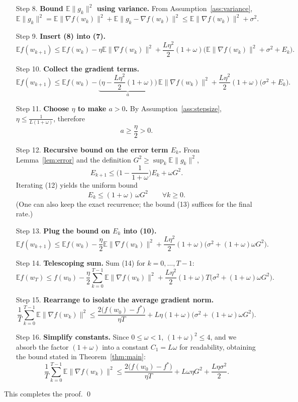 \documentclass{article}
\newcommand{\E}{\mathbb{E}}
\begin{document}
\begin{enumerate}
\item[Step 8.] \textbf{Bound $\E\|g_{k}\|^{2}$ using variance.}  
From Assumption~\ref{ass:variance},
\[
\E\|g_{k}\|^{2}
 =\E\|\nabla f(w_{k})\|^{2}+\E\|g_{k}-\nabla f(w_{k})\|^{2}
 \le \E\|\nabla f(w_{k})\|^{2}+\sigma^{2}. \tag{8}
\]

\item[Step 9.] \textbf{Insert (8) into (7).}
\[
\E f(w_{k+1})\le \E f(w_{k})
-\eta\E\|\nabla f(w_{k})\|^{2}
+\frac{L\eta^{2}}{2}(1+\omega)\Big(\E\|\nabla f(w_{k})\|^{2}+\sigma^{2}+E_{k}\Big). \tag{9}
\]

\item[Step 10.] \textbf{Collect the gradient terms.}
\[
\E f(w_{k+1})\le \E f(w_{k})
-\underbrace{\Big(\eta-\frac{L\eta^{2}}{2}(1+\omega)\Big)}_{\displaystyle a}\,\E\|\nabla f(w_{k})\|^{2}
+\frac{L\eta^{2}}{2}(1+\omega)\big(\sigma^{2}+E_{k}\big). \tag{10}
\]

\item[Step 11.] \textbf{Choose $\eta$ to make $a>0$.}  
By Assumption~\ref{ass:stepsize}, $\eta\le\frac{1}{L(1+\omega)}$, therefore
\[
a\ge \frac{\eta}{2}>0. \tag{11}
\]

\item[Step 12.] \textbf{Recursive bound on the error term $E_{k}$.}  
From Lemma~\ref{lem:error} and the definition $G^{2}\ge\sup_{k}\E\|g_{k}\|^{2}$,
\[
E_{k+1}\le\Big(1-\frac{1}{1+\omega}\Big)E_{k}+\omega G^{2}. \tag{12}
\]
Iterating (12) yields the uniform bound
\[
E_{k}\le (1+\omega)\,\omega G^{2}\qquad\forall k\ge0. \tag{13}
\]
(One can also keep the exact recurrence; the bound (13) suffices for the final rate.)

\item[Step 13.] \textbf{Plug the bound on $E_{k}$ into (10).}
\[
\E f(w_{k+1})\le \E f(w_{k})
-\frac{\eta}{2}\E\|\nabla f(w_{k})\|^{2}
+\frac{L\eta^{2}}{2}(1+\omega)\Big(\sigma^{2}+(1+\omega)\omega G^{2}\Big). \tag{14}
\]

\item[Step 14.] \textbf{Telescoping sum.}  
Sum (14) for $k=0,\dots,T-1$:
\[
\E f(w_{T})\le f(w_{0})
-\frac{\eta}{2}\sum_{k=0}^{T-1}\E\|\nabla f(w_{k})\|^{2}
+ \frac{L\eta^{2}}{2}(1+\omega)T\Big(\sigma^{2}+(1+\omega)\omega G^{2}\Big). \tag{15}
\]

\item[Step 15.] \textbf{Rearrange to isolate the average gradient norm.}
\[
\frac{1}{T}\sum_{k=0}^{T-1}\E\|\nabla f(w_{k})\|^{2}
\le
\frac{2\big(f(w_{0})-f^{*}\big)}{\eta T}
+L\eta(1+\omega)\Big(\sigma^{2}+(1+\omega)\omega G^{2}\Big). \tag{16}
\]

\item[Step 16.] \textbf{Simplify constants.}  
Since $0\le\omega<1$, $(1+\omega)^{2}\le 4$, and we absorb the factor $(1+\omega)$ into a constant $C_{1}=L\omega$ for readability, obtaining the bound stated in Theorem~\ref{thm:main}:
\[
\frac1T\sum_{k=0}^{T-1}\E\|\nabla f(w_{k})\|^{2}
\le
\frac{2\big(f(w_{0})-f^{*}\big)}{\eta T}
+L\omega\eta G^{2}
+\frac{L\eta\sigma^{2}}{2}.
\] 
\end{enumerate}
This completes the proof.  \qed
\end{document}
